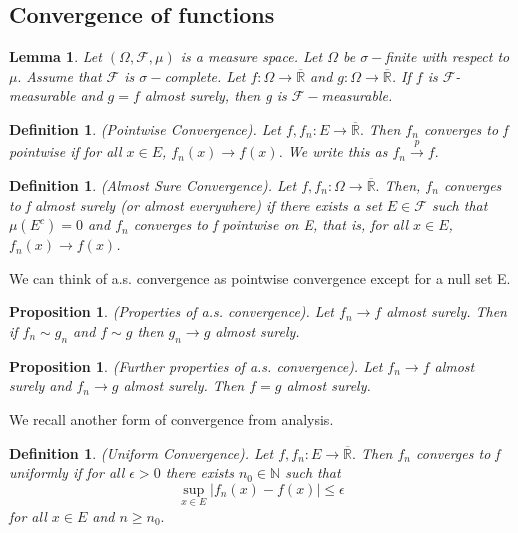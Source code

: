 \documentclass[twoside]{article}
\newtheorem{lemma}[theorem]{Lemma}
\newtheorem{proposition}[theorem]{Proposition}
\newtheorem{definition}[theorem]{Definition}
\newcommand{\sigmalgebra}{\mathcal{F}}
\newcommand{\extendedreal}{\overline{\mathbb{R}}}
\begin{document}
\subsection{Convergence of functions}

\begin{lemma}Let $(\Omega, \sigmalgebra, \mu)$ is a measure space. Let $\Omega$ be $\sigma-$finite with respect to $\mu.$ Assume that $\sigmalgebra$ is $\sigma-$complete. Let $f: \Omega \rightarrow \extendedreal$ and $g: \Omega \rightarrow \extendedreal$. If $f$ is $\sigmalgebra$-measurable and $g = f$ almost surely, then g is $\sigmalgebra-$measurable.
\end{lemma}

\begin{definition}(Pointwise Convergence). Let $f, f_n: E \rightarrow \extendedreal.$ Then $f_n$ converges to f pointwise if for all $x \in E$, $f_n(x) \rightarrow f(x)$. We write this as $f_n \xrightarrow{p} f.$
\end{definition}

\begin{definition}(Almost Sure Convergence). Let $f, f_n: \Omega \rightarrow \extendedreal.$  Then, $f_n$ converges to f almost surely (or almost everywhere) if there exists a set $E \in \sigmalgebra$ such that $\mu(E^c) = 0$ and $f_n$ converges to f pointwise on E, that is, for all $x \in E$, $f_n(x) \rightarrow f(x)$.
\end{definition}

We can think of a.s. convergence as pointwise convergence except for a null set E.

\begin{proposition}(Properties of a.s. convergence). Let $f_n \rightarrow f$ almost surely. Then if $f_n \sim g_n$ and $f \sim g$ then $g_n \rightarrow g$ almost surely.
\end{proposition}

\begin{proposition}(Further properties of a.s. convergence). Let $f_n \rightarrow f$ almost surely and $f_n \rightarrow g$ almost surely. Then $f = g$ almost surely.
\end{proposition}

We recall another form of convergence from analysis.
\begin{definition}(Uniform Convergence). Let $f, f_n: E \rightarrow \extendedreal.$ Then $f_n$ converges to f uniformly if for all $\epsilon > 0$ there exists $n_0 \in \mathbb{N}$ such that 
$$
\sup_{x \in E}|f_n(x) - f(x)| \leq \epsilon
$$
for all $x \in E$ and $n \geq n_0.$
\end{definition}
\end{document}
